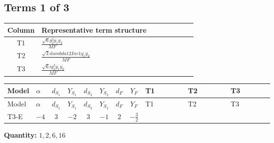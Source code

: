 \documentclass[8pt]{article}
\begin{document}
\begin{landscape}
\subsection*{Terms 1 of 3}
\begin{center}
\begin{tabular}{@{}c >{\raggedright\arraybackslash}p{0.82\linewidth}@{}}
\toprule
Column & Representative term structure \\
\midrule
T1 & \(\displaystyle \frac{\sqrt{6} g_{2}^{2} \overline{y_{1}} \overline{y_{2}}}{MF}\) \\
\midrule
T2 & \(\displaystyle \frac{\sqrt{3} i lambda12Inv1 \overline{y_{1}} \overline{y_{2}}}{MF}\) \\
\midrule
T3 & \(\displaystyle \frac{\sqrt{6} i g_{2}^{2} \overline{y_{1}} \overline{y_{2}}}{MF}\) \\
\midrule
\bottomrule
\end{tabular}
\end{center}
\smallskip
\tiny
\begin{longtable}{@{}llcccccc >{\raggedright\arraybackslash}p{0.21\linewidth} >{\raggedright\arraybackslash}p{0.21\linewidth} >{\raggedright\arraybackslash}p{0.21\linewidth}@{}}
\toprule
Model & $\alpha$ & $d_{S_1}$ & $Y_{S_1}$ & $d_{S_2}$ & $Y_{S_2}$ & $d_F$ & $Y_F$ & T1 & T2 & T3 \\
\midrule
\endfirsthead
\toprule
Model & $\alpha$ & $d_{S_1}$ & $Y_{S_1}$ & $d_{S_2}$ & $Y_{S_2}$ & $d_F$ & $Y_F$ & T1 & T2 & T3 \\
\midrule
\endhead
T3-E & $-4$ & $3$ & $-2$ & $3$ & $-1$ & $2$ & $-\frac{3}{2}$ & \scriptsize\adjustbox{max width=\linewidth}{$\begin{gathered} - \frac{\sqrt{6} g_{2}^{2} \overline{y_{1}} \overline{y_{2}}}{6 MF}\end{gathered}$} & \scriptsize\adjustbox{max width=\linewidth}{$\begin{gathered} - \frac{\sqrt{3} i lambda12Inv1 \overline{y_{1}} \overline{y_{2}}}{6 MF}\end{gathered}$} & \scriptsize\adjustbox{max width=\linewidth}{$\begin{gathered} \frac{\sqrt{6} i g_{2}^{2} \overline{y_{1}} \overline{y_{2}}}{6 MF}\end{gathered}$} \\
\midrule
\bottomrule
\end{longtable}
\clearpage
\noindent\textbf{Quantity: }$\mathrm{1,2,6,16}$\par\smallskip

\end{landscape}
\end{document}
